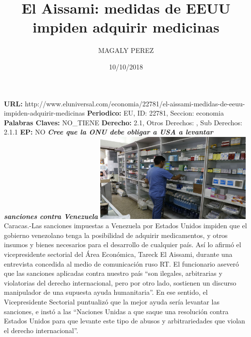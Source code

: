 \documentclass{article}%
\title{\textbf{El Aissami: medidas de EEUU impiden adquirir medicinas}}%
\author{MAGALY PEREZ}%
\date{10/10/2018}%
\begin{document}
%
\normalsize%
\maketitle%
\textbf{URL: }%
http://www.eluniversal.com/economia/22781/el{-}aissami{-}medidas{-}de{-}eeuu{-}impiden{-}adquirir{-}medicinas\newline%
%
\textbf{Periodico: }%
EU, %
ID: %
22781, %
Seccion: %
economia\newline%
%
\textbf{Palabras Claves: }%
NO\_TIENE\newline%
%
\textbf{Derecho: }%
2.1, %
Otros Derechos: %
, %
Sub Derechos: %
2.1.1\newline%
%
\textbf{EP: }%
NO\newline%
\newline%
%
\textbf{\textit{Cree que la ONU debe obligar a USA a levantar sanciones contra Venezuela}}%
\newline%
\newline%
%
\includegraphics[width=300px]{205.jpg}%
\newline%
%
Caracas.{-}Las sanciones impuestas a Venezuela por Estados Unidos impiden que el gobierno venezolano tenga la posibilidad de adquirir medicamentos, y otros insumos y bienes necesarios para el desarrollo de cualquier país.%
\newline%
%
Así lo afirmó el vicepresidente sectorial del Área Económica, Tareck El Aissami, durante una entrevista concedida al medio de comunicación ruso RT.%
\newline%
%
El funcionario aseveró que las sanciones aplicadas contra nuestro país “son ilegales, arbitrarias y violatorias del derecho internacional, pero por otro lado, sostienen un discurso manipulador de una supuesta ayuda humanitaria”.%
\newline%
%
En ese sentido, el Vicepresidente Sectorial puntualizó que la mejor ayuda sería levantar las sanciones, e instó a las “Naciones Unidas a que saque una resolución contra Estados Unidos para que levante este tipo de abusos y arbitrariedades que violan el derecho internacional”.%
\newline%
\end{document}
